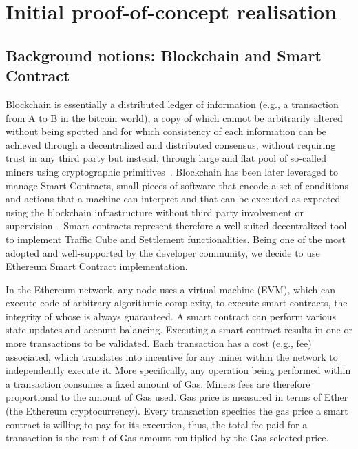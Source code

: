 \section{Initial proof-of-concept realisation}  \label{eq:realisation}


\subsection{Background notions: Blockchain and Smart Contract}  \label{sec:blockchain}
Blockchain is essentially a distributed ledger of information (e.g., a transaction from A to B in the bitcoin world), a copy of which cannot be arbitrarily altered without being spotted and for which consistency of each information can be achieved through a decentralized and distributed consensus, without requiring trust in any third party but instead, through large and flat pool of so-called miners using cryptographic primitives~\cite{nakamoto2008bitcoin}.
Blockchain has been later leveraged to manage Smart Contracts, small pieces of software that encode a set of conditions and actions that a machine can interpret and that can be executed as expected using the blockchain infrastructure without third party involvement or supervision~\cite{Buterin2014}. Smart contracts represent therefore a well-suited decentralized tool to implement Traffic Cube and Settlement functionalities. Being one of the most adopted and well-supported by the developer community, we decide to use Ethereum Smart Contract implementation.

In the Ethereum network, any node uses a virtual machine (EVM), which can execute code of arbitrary algorithmic complexity, to execute smart contracts, the integrity of whose is always guaranteed. A smart contract can perform various state updates and account balancing.  
Executing a smart contract results in one or more transactions to be validated. Each transaction has a cost (e.g., fee) associated, which translates into incentive for any miner within the network to independently execute it. 
More specifically, any operation being performed within a transaction consumes a fixed amount of Gas. Miners fees are therefore proportional to the amount of Gas used. Gas price is measured in terms of Ether (the Ethereum cryptocurrency). Every transaction specifies the gas price a smart contract is willing to pay for its execution, thus, the total fee paid for a transaction is the result of Gas amount multiplied by the Gas selected price.



